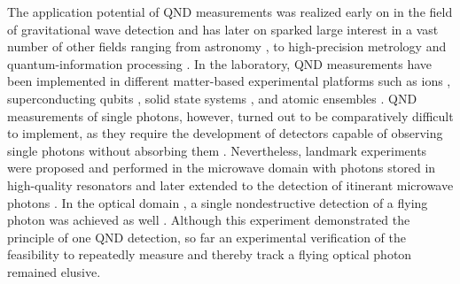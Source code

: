 \documentclass[prl,amsmath,amssymb,bibnotes,aps,longbibliography,12pt]{revtex4-1}
\begin{document}
The application potential of QND measurements was realized early on in the field of  gravitational wave detection \cite{braginsky1980,braginsky1996} and has later on sparked large interest in a vast number of other fields ranging from astronomy \cite{kellerer2014quantum}, to high-precision metrology \cite{giovanetti2004, ma2011} and quantum-information processing \cite{ralph2006}. In the laboratory, QND measurements have been implemented in different matter-based experimental platforms such as ions \cite{hume2007}, superconducting qubits \cite{lupacscu2007}, solid state systems \cite{neumann2010}, and atomic ensembles \cite{kuzmich2000}. QND measurements of single photons, however, turned out to be comparatively difficult to implement, as they require the development of detectors capable of observing single photons without absorbing them \cite{braginsky1989}. Nevertheless, landmark experiments were proposed and performed in the microwave domain with photons stored in high-quality resonators \cite{brune1992, nogues1999seeing, guerlin2007} and later extended to the detection of itinerant microwave photons \cite{kono2018quantum, besse2018}. In the optical domain \cite{friberg1992, grangier1998}, a single nondestructive detection of a flying photon was achieved as well \cite{reiserer2013}. Although this experiment demonstrated the principle of one QND detection, so far an experimental verification of the feasibility to repeatedly measure and thereby track a flying optical photon remained elusive. 
\end{document}
